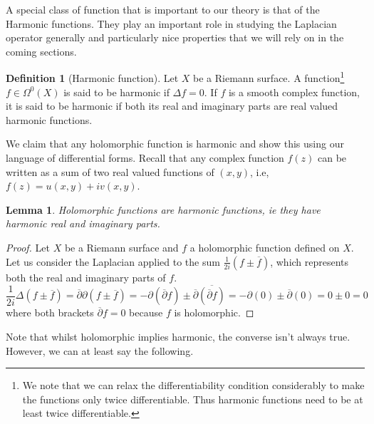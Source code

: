 \documentclass[11pt]{report}
\newtheorem{lemma}[thm]{Lemma}
\theoremstyle{definition}
\newtheorem{defn}[thm]{Definition}
\begin{document}
A special class of function that is important to our theory is that of the 
Harmonic functions. They play an important role in studying the Laplacian operator generally and particularly nice properties that we will rely on in the coming sections.
\begin{defn}[Harmonic function]\label{HarmonicDef}
  Let $X$ be a Riemann surface. A function\footnote{We note that we can relax the differentiability condition considerably to make the functions only twice differentiable. Thus harmonic functions need to be at least twice differentiable.} $f\in \Omega^0(X)$ is said to be harmonic if $\Delta f = 0$. If $f$ is a smooth complex function, it is said to be harmonic if both its real and imaginary parts are real valued harmonic functions.
\end{defn}
We claim that any holomorphic function is harmonic and show this using our language of differential forms. Recall that any complex function $f(z)$ can be written as a sum of two real valued functions of $(x,y)$, i.e, $f(z)=u(x,y)+iv(x,y)$.
\begin{lemma}\label{HolIsHarm}
  Holomorphic functions are harmonic functions, ie they have harmonic real and imaginary parts. 
\end{lemma} 
\begin{proof}
  Let $X$ be a Riemann surface and $f$ a holomorphic function defined on $X$.
  Let us consider the Laplacian applied to the sum $\frac{1}{2i}(f \pm \overline{f})$, which represents both the real and imaginary parts of $f$.
  \[\frac{1}{2i}\Delta(f \pm \overline{f}) = \overline{\partial}\partial(f \pm \overline{f})=-\partial(\overline{\partial}f) \pm \overline{\partial}\overline{(\overline{\partial}f)}=-\partial(0) \pm \overline{\partial}(0) = 0 \pm 0 = 0\]
  where both brackets $\overline{\partial} f = 0$ because $f$ is holomorphic.
\end{proof}

Note that whilst holomorphic implies harmonic, the converse isn't always true. However, we can at least say the following.
\end{document}
